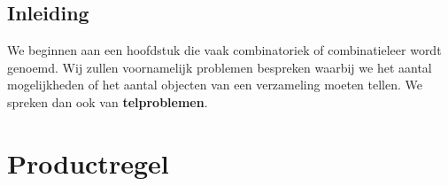 \documentclass[12pt,twoside]{article}
\begin{document}
\begin{cursus}
\thispagestyle{empty}
\newpage
\thispagestyle{empty}
\tableofcontents
\newpage
\clearpage
{}
\pagestyle{fancy}
\lhead{}

\onehalfspacing

\section{Inleiding}

We beginnen aan een hoofdstuk die vaak combinatoriek of combinatieleer wordt genoemd. Wij zullen voornamelijk problemen bespreken waarbij we het aantal mogelijkheden of het aantal objecten van een verzameling moeten tellen. We spreken dan ook van {\bf telproblemen}.

\end{cursus}

\section{Productregel}
\end{document}
